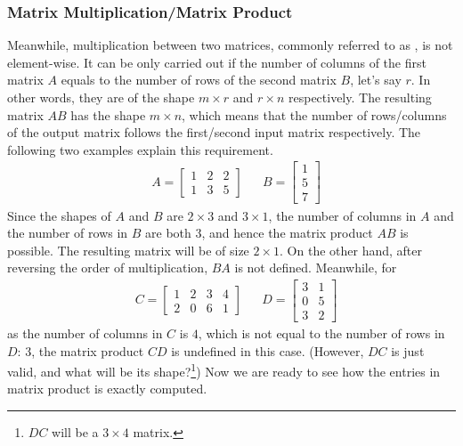 \subsubsection{Matrix Multiplication/Matrix Product} Meanwhile, multiplication between two matrices, commonly referred to as , is not element-wise. It can be only carried out if the number of columns of the first matrix $A$ equals to the number of rows of the second matrix $B$, let's say $r$. In other words, they are of the shape $m \times r$ and $r \times n$ respectively. The resulting matrix $AB$ has the shape $m \times n$, which means that the number of rows/columns of the output matrix follows the first/second input matrix respectively. The following two examples explain this requirement.
\begin{align*}
& A = 
\begin{bmatrix}
1 & 2 & 2 \\
1 & 3 & 5
\end{bmatrix} &
& B = 
\begin{bmatrix}
1 \\
5 \\
7 
\end{bmatrix}
\end{align*}
Since the shapes of $A$ and $B$ are $2 \times 3$ and $3 \times 1$, the number of columns in $A$ and the number of rows in $B$ are both $3$, and hence the matrix product $AB$ is possible. The resulting matrix will be of size $2 \times 1$. On the other hand, after reversing the order of multiplication, $BA$ is not defined. Meanwhile, for
\begin{align*}
& C = 
\begin{bmatrix}
1 & 2 & 3 & 4 \\
2 & 0 & 6 & 1
\end{bmatrix} &
& D = 
\begin{bmatrix}
3 & 1\\
0 & 5\\
3 & 2
\end{bmatrix}
\end{align*}
as the number of columns in $C$ is $4$, which is not equal to the number of rows in $D$: $3$, the matrix product $CD$ is undefined in this case. (However, $DC$ is just valid, and what will be its shape?\footnote{$DC$ will be a $3 \times 4$ matrix.}) Now we are ready to see how the entries in matrix product is exactly computed.

